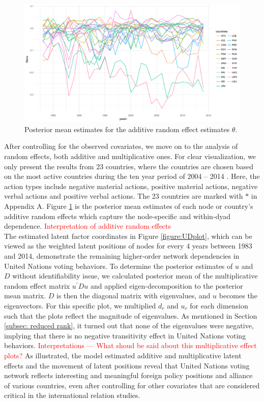\documentclass[a4paper]{article}
\begin{document}
 \begin{figure}[ht]
 	\begin{center}
 		\includegraphics[width=1\textwidth]{plots/theta_reduced.pdf}	
 	\end{center}
 	\caption {Posterior mean estimates for the additive random effect estimates $\theta$.}
 	\label{figure:thetaplot}
 \end{figure}
\noindent After controlling for the observed covariates, we move on to the analysis of random effects, both additive and multiplicative ones. For clear visualization, we only present the results from 23 countries, where the countries are chosen based on the most active countries during the ten year period of 2004 -- 2014 \citep{hoff2015multilinear}. Here, the action types include negative material actions, positive material actions, negative verbal actions and positive verbal actions. The 23 countries are marked with $*$ in Appendix A. Figure \ref{figure:thetaplot} is the posterior mean estimates of each node or country's additive random effects which capture the node-specific and within-dyad dependence. \textcolor{red}{Interpretation of additive random effects}\\ \newpage
\noindent The estimated latent factor coordinates in Figure \ref{figure:UDplot}, which can be viewed as the weighted latent positions of nodes for every 4 years between 1983 and 2014, demonstrate the remaining higher-order network dependencies in United Nations voting behaviors. To determine the posterior estimates of $u$ and $D$ without identifiability issue, we calculated posterior mean of the multiplicative random effect matrix $u^\prime Du$ and applied eigen-decomposition to the posterior mean matrix. $D$ is then the diagonal matrix with eigenvalues, and $u$ becomes the eigenvectors. For this specific plot, we multiplied $d_r$ and $u_{r}$ for each dimension such that the plots reflect the magnitude of eigenvalues.  As mentioned in Section \ref{subsec: reduced rank}, it turned out that none of the eigenvalues were negative, implying that there is no negative transitivity effect in United Nations voting behaviors. \textcolor{red}{Interpretations --- What shoud be said about this multiplicative effect plots?} As illustrated, the model estimated additive and multiplicative latent effects and the movement of latent positions reveal that United Nations voting network reflects interesting and meaningful foreign policy positions and alliance of various countries, even after controlling for other covariates that are considered critical in the international relation studies.
\end{document}
